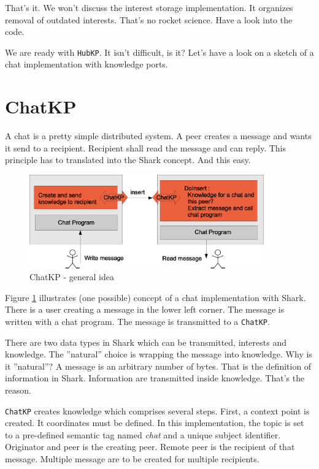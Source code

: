 {That's it. We won't discuss the interest storage implementation. It organizes removal of outdated interests. That's no rocket science. Have a look into the code.

We are ready with {\tt HubKP}. It isn't difficult, is it? Let's have a look on a sketch of a chat implementation with knowledge ports.

\section{ChatKP}
\label{sec:chatkp}
A chat is a pretty simple distributed system. A peer creates a message and wants it send to a recipient. Recipient shall read the message and can reply. This principle has to translated into the Shark concept. And this easy.

\begin{figure}[t]
\centering
\includegraphics[width=0.90\textwidth]{chatKP.eps}
\caption{ChatKP - general idea}
\label{fig:chatKP}
\end{figure}

Figure \ref{fig:chatKP} illustrates (one possible) concept of a chat implementation with Shark. There is a user creating a message in the lower left corner. The message is written with a chat program. The message is transmitted to a {\tt ChatKP}.

There are two data types in Shark which can be transmitted, interests and knowledge. The ''natural'' choice is wrapping the message into knowledge. Why is it ''natural''? A message is an arbitrary number of bytes. That is the definition of information in Shark. Information are transmitted inside knowledge. That's the reason.

{\tt ChatKP} creates knowledge which comprises several steps. First, a context point is created. It coordinates must be defined. In this implementation, the topic is set to a pre-defined semantic tag named {\it chat} and a unique subject identifier. Originator and peer is the creating peer. Remote peer is the recipient of that message. Multiple message are to be created for multiple recipients.

}
